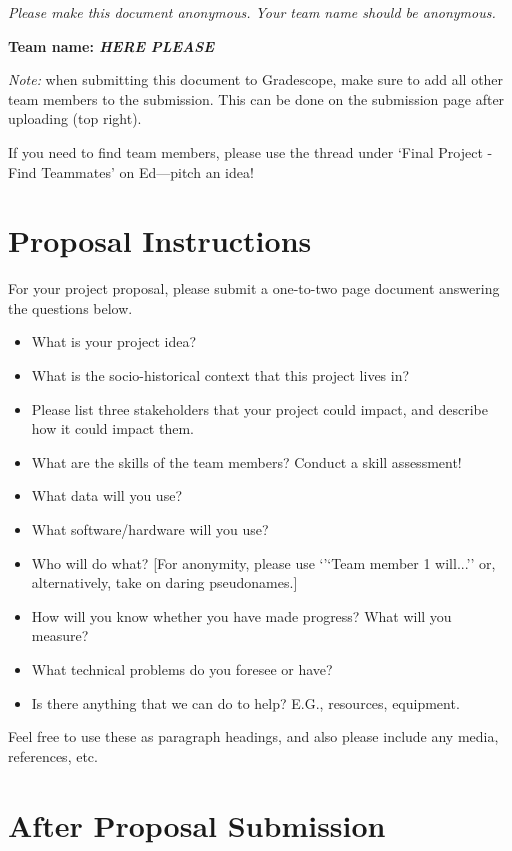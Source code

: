 \emph{Please make this document anonymous. Your team name should be anonymous.}

\textbf{Team name: \emph{HERE PLEASE}}

\emph{Note:} when submitting this document to Gradescope, make sure to add all other team members to the submission. This can be done on the submission page after uploading (top right).

If you need to find team members, please use the thread under `Final Project - Find Teammates' on Ed---pitch an idea!

\section*{Proposal Instructions}

For your project proposal, please submit a one-to-two page document answering the questions below.

\begin{itemize}
  \item What is your project idea?  
  \item What is the socio-historical context that this project lives in? 
  \item Please list three stakeholders that your project could impact, and describe how it could impact them.
  \item What are the skills of the team members? Conduct a skill assessment!
  \item What data will you use?
  \item What software/hardware will you use?
  \item Who will do what? [For anonymity, please use `'`Team member 1 will...'' or, alternatively, take on daring pseudonames.]
  \item How will you know whether you have made progress? What will you measure?
  \item What technical problems do you foresee or have?
  \item Is there anything that we can do to help? E.G., resources, equipment.
\end{itemize}

Feel free to use these as paragraph headings, and also please include any media, references, etc.

\section*{After Proposal Submission}

